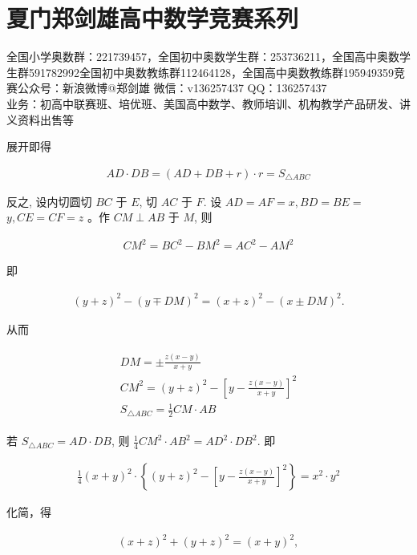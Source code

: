 \documentclass[10pt]{article}
\begin{document}
\section*{夏门郑剑雄高中数学竞赛系列}
全国小学奥数群：221739457，全国初中奥数学生群：253736211，全国高中奥数学生群591782992全国初中奥数教练群112464128，全国高中奥数教练群195949359竞赛公众号：新浪微博@郑剑雄 微信：v136257437 QQ：136257437\\
业务：初高中联赛班、培优班、美国高中数学、教师培训、机构教学产品研发、讲义资料出售等

展开即得

\begin{align*}
A D \cdot D B=(A D+D B+r) \cdot r=S_{\triangle A B C}
\end{align*}

反之, 设内切圆切 $B C$ 于 $E$, 切 $A C$ 于 $F$. 设 $A D=A F=x, B D=B E=$ $y, C E=C F=z$ 。作 $C M \perp A B$ 于 $M$, 则

\begin{align*}
C M^{2}=B C^{2}-B M^{2}=A C^{2}-A M^{2}
\end{align*}

即

\begin{align*}
(y+z)^{2}-(y \mp D M)^{2}=(x+z)^{2}-(x \pm D M)^{2} .
\end{align*}

从而

\begin{align*}
\begin{gathered}
D M= \pm \frac{z(x-y)}{x+y} \\
C M^{2}=(y+z)^{2}-\left[y-\frac{z(x-y)}{x+y}\right]^{2} \\
S_{\triangle A B C}=\frac{1}{2} C M \cdot A B
\end{gathered}
\end{align*}

若 $S_{\triangle A B C}=A D \cdot D B$, 则 $\frac{1}{4} C M^{2} \cdot A B^{2}=A D^{2} \cdot D B^{2}$. 即

\begin{align*}
\frac{1}{4}(x+y)^{2} \cdot\left\{(y+z)^{2}-\left[y-\frac{z(x-y)}{x+y}\right]^{2}\right\}=x^{2} \cdot y^{2}
\end{align*}

化简，得

\begin{align*}
(x+z)^{2}+(y+z)^{2}=(x+y)^{2},
\end{align*}
\end{document}
